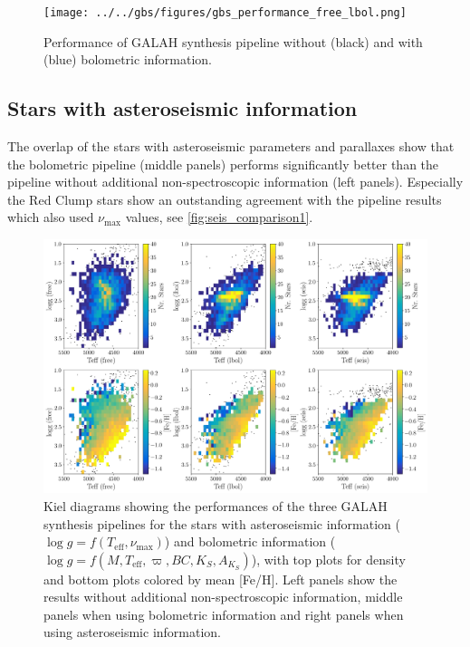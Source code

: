 \documentclass[a4paper,11pt,english]{article}
\begin{document}
\begin{figure}[!ht]
\centering
\texttt{[image: ../../gbs/figures/gbs\_performance\_free\_lbol.png]}
\caption{Performance of GALAH synthesis pipeline without (black) and with (blue) bolometric information.}
\label{fig:gbs_performance}
\end{figure}

\subsection{Stars with asteroseismic information}

The overlap of the stars with asteroseismic parameters and parallaxes show that the bolometric pipeline (middle panels) performs significantly better than the pipeline without additional non-spectroscopic information (left panels). Especially the Red Clump stars show an outstanding agreement with the pipeline results which also used $\nu_\text{max}$ values, see \autoref{fig:seis_comparison1}.

\begin{figure}[!ht]
\centering
\includegraphics[width=\textwidth]{../../seis/figures/seis_comparison_3setups.png}
\caption{Kiel diagrams showing the performances of the three GALAH synthesis pipelines for the stars with asteroseismic information ($\log g = f(T_\text{eff}, \nu_\text{max})$) and bolometric information ($\log g = f(M, T_\text{eff}, \varpi, BC, K_S, A_{K_S})$), with top plots for density and bottom plots colored by mean [Fe/H]. Left panels show the results without additional non-spectroscopic information, middle panels when using bolometric information and right panels when using asteroseismic information.}
\label{fig:seis_comparison1}
\end{figure}
\end{document}
